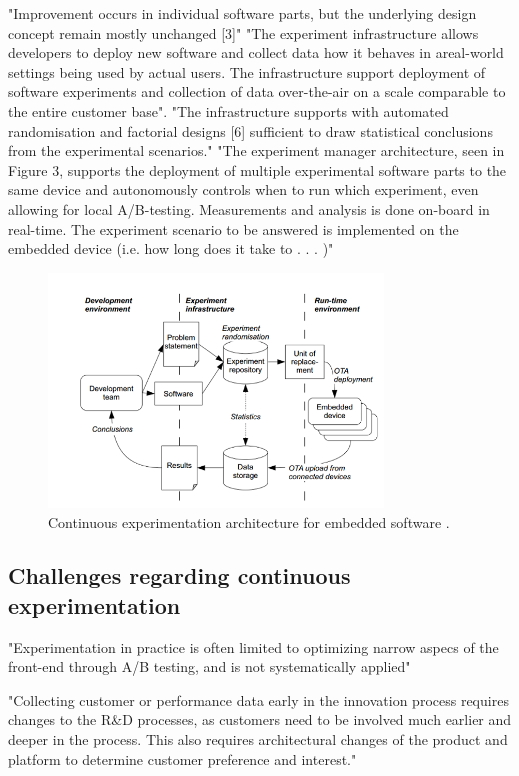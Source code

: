 \documentclass[english]{tktltiki2}
\theoremstyle{definition}
\theoremstyle{remark}
\begin{document}
"Improvement occurs in individual software parts, but the underlying design concept remain mostly unchanged [3]"
"The experiment infrastructure allows developers to deploy new software and collect data how it behaves in areal-world settings being used by actual users. The infrastructure support deployment of software experiments and collection of data over-the-air on a scale comparable to the entire customer base". 
"The infrastructure supports with automated randomisation and factorial designs [6] sufficient to draw statistical conclusions from the experimental scenarios."
"The experiment manager architecture, seen in Figure 3, supports the deployment of multiple experimental software parts to the same device and autonomously controls when to run which experiment, even allowing for local A/B-testing. Measurements and analysis is done on-board in real-time. The experiment scenario to be answered is implemented on the embedded device (i.e. how long does it take to . . . )"
\begin{figure}[h]
	\centering
	\includegraphics[width=3.5in]{embedded.png}
	\caption{Continuous experimentation architecture for embedded software \cite{eklund2012architecture}.}
	\label{fig4}
\end{figure}

\subsection{Challenges regarding continuous experimentation}
"Experimentation in practice is often limited to optimizing narrow aspecs of the front-end through A/B testing, and is not systematically applied" \cite{bosch2012building} 

"Collecting customer or performance data early in the innovation process requires changes to the R\&D processes, as customers need to be involved much earlier and deeper in the process. This also requires architectural changes of the product and platform to determine customer preference and interest." \cite{bosch2012building}
\end{document}
